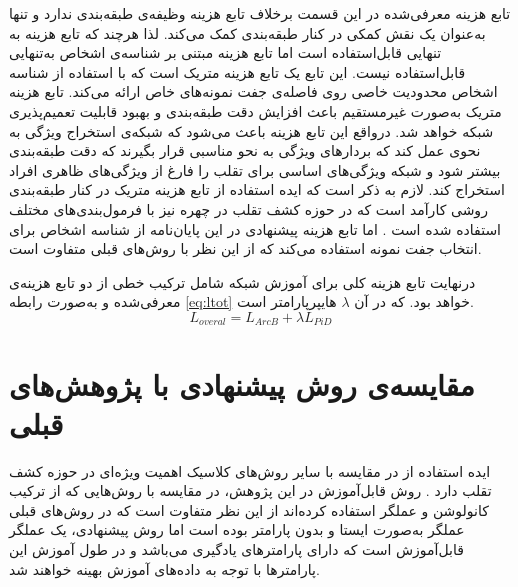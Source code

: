  تابع هزینه معرفی‌شده در این قسمت بر‌خلاف تابع هزینه
 وظیفه‌ی طبقه‌بندی ندارد و تنها به‌عنوان یک نقش کمکی در کنار طبقه‌بندی کمک می‌کند. لذا هرچند که تابع هزینه 
  به تنهایی قابل‌استفاده است اما تابع هزینه مبتنی بر شناسه‌ی اشخاص به‌تنهایی قابل‌استفاده نیست. این تابع یک تابع هزینه متریک است که با استفاده از شناسه اشخاص محدودیت خاصی روی فاصله‌ی جفت نمونه‌های خاص ارائه می‌کند. تابع هزینه متریک به‌صورت غیر‌مستقیم باعث افزایش دقت طبقه‌بندی و بهبود قابلیت تعمیم‌پذیری شبکه خواهد شد. در‌واقع این تابع هزینه باعث می‌شود که شبکه‌ی استخراج ویژگی به نحوی عمل کند که بردار‌های ویژگی به نحو مناسبی قرار بگیرند که دقت طبقه‌بندی بیشتر شود و شبکه ویژگی‌های اساسی برای تقلب را فارغ از ویژگی‌های ظاهری افراد استخراج کند. لازم به ذکر است که ایده استفاده از تابع هزینه متریک در کنار طبقه‌بندی روشی کارآمد است که در حوزه کشف تقلب در چهره نیز با فرمول‌بندی‌های مختلف استفاده شده است
\cite{shao2019multi,jia2020single,feng2020learning,perez2019deep,tu2020learning,xu2021improving}.
اما تابع هزینه پیشنهادی در این پایان‌نامه از شناسه اشخاص برای انتخاب جفت نمونه استفاده می‌کند که از این نظر با روش‌های قبلی متفاوت است.
  
  در‌نهایت تابع هزینه کلی برای آموزش شبکه شامل ترکیب خطی از دو تابع هزینه‌ی معرفی‌شده و به‌صورت رابطه
\ref{eq:ltot}
 خواهد بود. که در آن 
 $\lambda$
   هایپر‌پارامتر است.
\begin{equation}\label{eq:ltot}
	L_{overal} = L_{ArcB} + \lambda L_{PiD}
\end{equation}

\section{مقایسه‌ی روش پیشنهادی با پژوهش‌های قبلی}
ایده استفاده از 
در مقایسه با سایر روش‌های کلاسیک اهمیت ویژه‌ای در حوزه کشف تقلب دارد
\cite{maatta2011face,chingovska2012effectiveness,freitas2012lbp,rehman2020enhancing,li2019face,yu2020searching,zhang2020face}.
روش  قابل‌آموزش در این پژوهش، در مقایسه با روش‌هایی که از ترکیب کانولوشن و عملگر  استفاده کرده‌اند
\cite{li2019face,rehman2020enhancing}
از این نظر متفاوت است که در روش‌های قبلی عملگر  به‌صورت ایستا و بدون پارامتر بوده است اما روش پیشنهادی، یک عملگر قابل‌آموزش است که دارای پارامترهای یادگیری می‌باشد و در طول آموزش این پارامترها با توجه به داده‌های آموزش بهینه خواهند شد.

